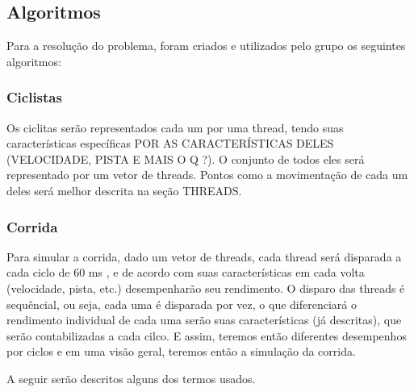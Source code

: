 \documentclass[12pt,a4paper]{article}
\begin{document}
\subsection{Algoritmos}

	Para a resolução do problema, foram criados e utilizados pelo grupo os seguintes algoritmos:
    
\subsubsection{Ciclistas}
	Os ciclitas serão representados cada um por uma thread, tendo suas características específicas POR AS CARACTERÍSTICAS DELES (VELOCIDADE, PISTA E MAIS O Q ?). O conjunto de todos eles será representado por um vetor de threads.
    Pontos como a movimentação de cada um deles será melhor descrita na seção THREADS. 

\subsubsection{Corrida}

	Para simular a corrida, dado um vetor de threads, cada thread será disparada a cada ciclo de 60 ms , e de acordo com suas características em cada volta (velocidade, pista, etc.) desempenharão seu rendimento. O disparo das threads é sequêncial, ou seja, cada uma é disparada por vez, o que diferenciará o rendimento individual de cada uma serão suas características (já descritas), que serão contabilizadas a cada cilco. E assim, teremos então diferentes desempenhos por ciclos e em uma visão geral, teremos então a simulação da corrida. 

	A seguir serão descritos alguns dos termos usados.
    
\end{document}

